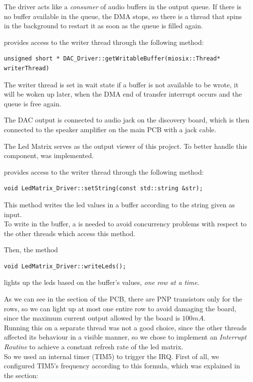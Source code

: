 The driver acts like a \textit{consumer} of audio buffers in the output queue.
If there is no buffer available in the queue, the DMA stops, so there is a thread that spins in the background to restart it as soon as the queue is filled again.
    
 provides access to the writer thread through the following method: \\
\begin{lstlisting}
unsigned short * DAC_Driver::getWritableBuffer(miosix::Thread* writerThread)
\end{lstlisting}
The writer thread is set in wait state if a buffer is not available to be wrote, it will be woken up later, when the DMA end of transfer interrupt occurs and the queue is free again.\par
    
The DAC output is connected to audio jack on the discovery board, which is then connected to the speaker amplifier on the main PCB with a jack cable.
    
    
\label{sec:LED}
The Led Matrix serves as the output viewer of this project.
To better handle this component,  was implemented. \par

 provides access to the writer thread through the following method: \\
\begin{lstlisting}
void LedMatrix_Driver::setString(const std::string &str);
\end{lstlisting}

This method writes the led values in a buffer according to the string given as input. \\
To write in the buffer, a  is needed to avoid concurrency problems with respect to the other threads which access this method. \par
Then, the method \\

\begin{lstlisting}
void LedMatrix_Driver::writeLeds();
\end{lstlisting}
lights up the leds based on the buffer's values, \textit{one row at a time}.


As we can see in the  section of the PCB, there are PNP transistors only for the rows, so we can light up at most one entire row to avoid damaging the board, since the maximum current output allowed by the board is $100 mA$. \\
Running this on a separate thread was not a good choice, since the other threads affected its behaviour in a visible manner, so we chose to implement an \textit{Interrupt Routine} to achieve a constant refresh rate of the led matrix.\\
So we used an internal timer (TIM5) to trigger the IRQ.
First of all, we configured TIM5's frequency according to this formula, which was explained in the  section:


